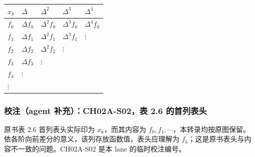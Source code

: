 \documentclass[
  10pt,
  fontset=fandol]{ctexart}
\newcounter{none} %
\begin{document}
{\def\LTcaptype{none} %
\begin{longtable}[]{@{}
  >{\raggedright\arraybackslash}p{}
  >{\raggedright\arraybackslash}p{}
  >{\raggedright\arraybackslash}p{}
  >{\raggedright\arraybackslash}p{}
  >{\raggedright\arraybackslash}p{}@{}}
\toprule\noalign{}
\begin{minipage}[b]{\linewidth}\raggedright
\(x_k\)
\end{minipage} & \begin{minipage}[b]{\linewidth}\raggedright
\(\Delta\)
\end{minipage} & \begin{minipage}[b]{\linewidth}\raggedright
\(\Delta^2\)
\end{minipage} & \begin{minipage}[b]{\linewidth}\raggedright
\(\Delta^3\)
\end{minipage} & \begin{minipage}[b]{\linewidth}\raggedright
\(\Delta^4\)
\end{minipage} \\
\midrule\noalign{}
\endhead
\bottomrule\noalign{}
\endlastfoot
\(f_0\) & \(\Delta f_0\) & \(\Delta^2 f_0\) & \(\Delta^3 f_0\) & \(\Delta^4 f_0\) \\
\(f_1\) & \(\Delta f_1\) & \(\Delta^2 f_1\) & \(\Delta^3 f_1\) & \(\vdots\) \\
\(f_2\) & \(\Delta f_2\) & \(\Delta^2 f_2\) & \(\vdots\) & \\
\(f_3\) & \(\Delta f_3\) & \(\vdots\) & & \\
\(f_4\) & \(\vdots\) & & & \\
\(\vdots\) & & & & \\
\end{longtable}
}

\subsubsection{校注（agent 补充）：CH02A-S02，表 2.6 的首列表头}\label{ux6821ux6ce8agent-ux8865ux5145ch02a-s02ux8868-2.6-ux7684ux9996ux5217ux8868ux5934}

原书表 2.6 首列表头实际印为 \(x_k\)，而其内容为 \(f_0,f_1,\cdots\)，本转录均按原图保留。依各阶向前差分的意义，该列存放函数值，表头应理解为 \(f_k\)；这是原书表头与内容不一致的问题。CH02A-S02 是本 lane 的临时校注编号。
\end{document}
